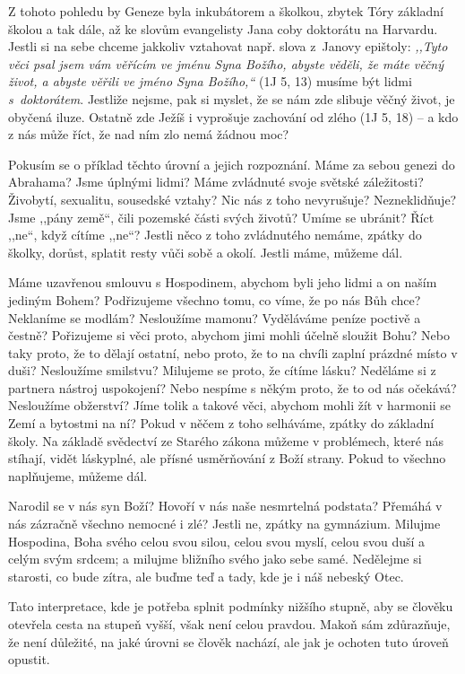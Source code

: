 Z tohoto pohledu by Geneze byla inkubátorem a školkou, zbytek Tóry základní
školou a tak dále, až ke slovům evangelisty Jana coby doktorátu na Harvardu.
Jestli si na sebe chceme jakkoliv vztahovat např. slova z~Janovy epištoly:
\textit{,,Tyto věci psal jsem vám věřícím ve jménu Syna Božího, abyste věděli,
že máte věčný život, a abyste věřili ve jméno Syna Božího,``} (1J 5, 13) musíme
být lidmi \textit{s~doktorátem}. Jestliže nejsme, pak si myslet, že se nám zde
slibuje věčný život, je obyčená iluze. Ostatně zde Ježíš i vyprošuje zachování
od zlého (1J 5, 18) -- a kdo z nás může říct, že nad ním zlo nemá žádnou moc?

Pokusím se o příklad těchto úrovní a jejich rozpoznání. Máme za sebou genezi do
Abrahama? Jsme úplnými lidmi? Máme zvládnuté svoje světské záležitosti?
Živobytí, sexualitu, sousedské vztahy? Nic nás z toho nevyrušuje? Nezneklidňuje?
Jsme ,,pány země``, čili pozemské části svých životů? Umíme se ubránit? Říct ,,ne``,
když cítíme ,,ne``? Jestli něco z toho zvládnutého nemáme, zpátky do školky,
dorůst, splatit resty vůči sobě a okolí. Jestli máme, můžeme dál.

Máme uzavřenou smlouvu s Hospodinem, abychom byli jeho lidmi a on naším jediným
Bohem? Podřizujeme všechno tomu, co víme, že po nás Bůh chce? Neklaníme se
modlám?
Nesloužíme mamonu? Vyděláváme peníze poctivě a čestně? Pořizujeme si věci proto,
abychom jimi mohli účelně sloužit Bohu? Nebo taky proto, že to dělají ostatní,
nebo proto, že to na chvíli zaplní prázdné místo v duši?
Nesloužíme smilstvu? Milujeme se proto, že cítíme lásku? Neděláme si z partnera
nástroj uspokojení? Nebo nespíme s někým proto, že to od nás očekává?
Nesloužíme obžerství? Jíme tolik a takové věci, abychom mohli žít v harmonii se
Zemí a bytostmi na ní?
Pokud v něčem z toho selháváme, zpátky do základní školy. Na základě svědectví
ze Starého zákona můžeme v problémech, které nás stíhají, vidět láskyplné, ale
přísné usměrňování z Boží strany. Pokud to všechno naplňujeme, můžeme dál.

Narodil se v nás syn Boží? Hovoří v nás naše nesmrtelná podstata? Přemáhá v nás
zázračně všechno nemocné i zlé?
Jestli ne, zpátky na gymnázium. Milujme Hospodina, Boha svého celou svou silou,
celou svou myslí, celou svou duší a celým svým srdcem; a milujme bližního svého
jako sebe samé. Nedělejme si starosti, co bude zítra, ale buďme teď a tady, kde
je i náš nebeský Otec.

Tato interpretace, kde je potřeba splnit podmínky nižšího stupně, aby se člověku
otevřela cesta na stupeň vyšší, však není celou pravdou. Makoň sám zdůrazňuje,
že není důležité, na jaké úrovni se člověk nachází, ale jak je ochoten tuto
úroveň opustit.


